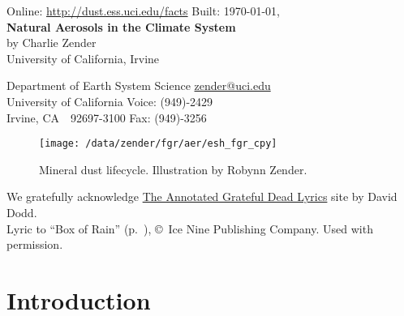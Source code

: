 \documentclass[12pt,twoside]{book}
\begin{document}

\ifpdf %
\fi %

\begin{center}
Online: \url{http://dust.ess.uci.edu/facts} \hfill Built: \shortdate\today, \xxivtime\\
\bigskip
{\Large \textbf{Natural Aerosols in the Climate System}}\\
\bigskip
by Charlie Zender\\
University of California, Irvine\\
\end{center}
Department of Earth System Science \hfill \url{zender@uci.edu}\\
University of California \hfill Voice: (949)-2429\\
Irvine, CA~~92697-3100 \hfill Fax: (949)-3256

\begin{figure*}[b]
\centering
\texttt{[image: /data/zender/fgr/aer/esh\_fgr\_cpy]}\vfill
\caption[Mineral Dust Lifecycle]{
Mineral dust lifecycle. 
Illustration by Robynn Zender.
\label{fgr:esh}}
\end{figure*}

\frontmatter %
\setcounter{page}{1}
\pagestyle{headings}
\thispagestyle{empty}

\noindent We gratefully acknowledge \href{http://arts.ucsc.edu/gdead/agdl}{The Annotated Grateful Dead Lyrics} site by David Dodd.\\
\noindent Lyric to ``Box of Rain'' (p.~\pageref{BoR}), \copyright\ Ice Nine Publishing Company. Used with permission.\\

\tableofcontents
\listoffigures
\listoftables
\clearpage

\mainmatter %
\setcounter{page}{1}

\chapter{Introduction}\label{sxn:ntr}
\end{document}
